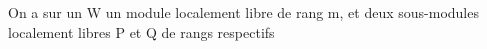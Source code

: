 On a sur un   W un module localement libre  de rang m,
et deux sous-modules localement libres P et Q de rangs respectifs

